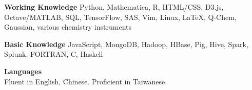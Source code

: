 \documentclass[12pt,letterpaper]{article}
\newcommand{\mhead}[1]{\leavevmode\marginpar{\sffamily\footnotesize #1}}
\begin{document}
\bigskip
\mhead{Skills}%
\textbf{Working Knowledge}\newline%
Python, Mathematica, R, HTML/CSS, D3.js, Octave/MATLAB, SQL, TensorFlow, SAS, Vim, Linux, \LaTeX,
Q-Chem, Gaussian, various chemistry instruments

\smallskip
\textbf{Basic Knowledge}\newline%
JavaScript, MongoDB,  Hadoop, HBase, Pig, Hive, Spark, Splunk, FORTRAN, C, Haskell

\smallskip
\textbf{Languages}\\
Fluent in English, Chinese. Proficient in Taiwanese.
\end{document}
